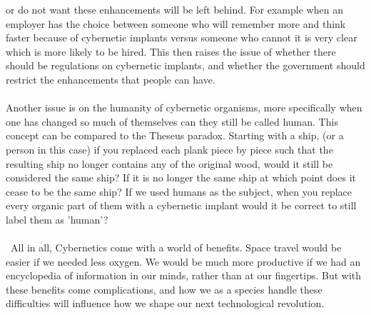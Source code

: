 \documentclass[12pt,a4paper,notitlepage]{article}
\begin{document}
or do not want these enhancements will be left behind. For example when an
employer has the choice between someone who will remember more and think faster
because of cybernetic implants versus someone who cannot it is very clear which
is more likely to be hired. This then raises the issue of whether there should
be regulations on cybernetic implants, and whether the government should
restrict the enhancements that people can have. 
\\\\
Another issue is on the humanity of cybernetic organisms, more specifically when
one has changed so much of themselves can they still be called human. This
concept can be compared to the Theseus paradox. Starting with a ship, (or a
person in this case) if you replaced each plank piece by piece such that the
resulting ship no longer contains any of the original wood, would it still be
considered the same ship? If it is no longer the same ship at which point does
it cease to be the same ship? If we used humans as the subject, when you replace
every organic part of them with a cybernetic implant would it be correct to
still label them as 'human'?
\\\\\
All in all, Cybernetics come with a world of benefits. Space travel would be
easier if we needed less oxygen. We would be much more productive if we had an
encyclopedia of information in our minds, rather than at our fingertips. But
with these benefits come complications, and how we as a species handle these
difficulties will influence how we shape our next technological revolution.
\newpage
\end{document}
